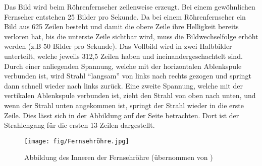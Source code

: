 Das Bild wird beim Röhrenfernseher zeilenweise erzeugt.
Bei einem gewöhnlichen Fernseher entstehen 25 Bilder pro Sekunde.
Da bei einem Röhrenfernseher ein Bild aus 625 Zeilen besteht und damit die obere Zeile ihre Helligkeit bereits verloren hat, bis die unterste Zeile sichtbar wird, muss die Bildwechselfolge erhöht werden (z.B 50 Bilder pro Sekunde).
Das Vollbild wird in zwei Halbbilder unterteilt, welche jeweils 312,5 Zeilen haben und ineinandergeschachtelt sind.
Durch einer anliegenden Spannung, welche mit der horizontalen Ablenkspule verbunden ist, wird Strahl "`langsam"' von links nach rechts gezogen und springt dann schnell wieder nach links zurück.
Eine zweite Spannung, welche mit der vertikalen Ablenkspule verbunden ist, zieht den Strahl von oben nach unten, und wenn der Strahl unten angekommen ist, springt der Strahl wieder in die erste Zeile.
Dies lässt sich in der Abbildung auf der Seite \cite{Roehrenfernsehr} betrachten.
Dort ist der Strahlengang für die ersten 13 Zeilen dargestellt.
\begin{figure}[h]
    \centering
    \texttt{[image: fig/Fernsehröhre.jpg]}
    \caption{Abbildung des Inneren der Fernsehröhre (übernommen von \cite{Abbildung}) }
    \label{fig:Fernsehroehre}
\end{figure}
